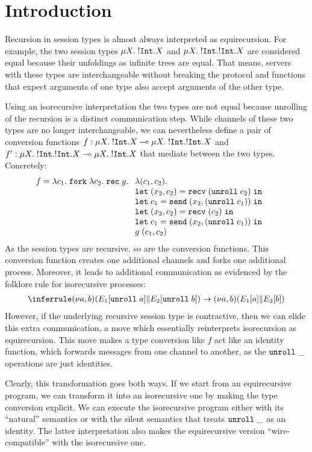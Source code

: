 
\section{Introduction}
\label{sec:introduction}

Recursion in session types is almost always interpreted as
equirecursion. For example, the two session types $\mu X.\;{{}!\mathtt{Int}.X} $
and $\mu X.\;{{}!\mathtt{Int}.{}!\mathtt{Int}.X} $ are considered equal because
their unfoldings as infinite trees are equal. That means, servers with
these types are interchangeable without breaking the protocol and
functions that expect arguments of one type also accept arguments of
the other type.

Using an isorecursive interpretation the two types are not equal
because unrolling of the recursion is a distinct communication
step. While channels of these two types are no longer
interchangeable, we can nevertheless define a pair of conversion
functions
$f : \mu X.\;{{}!\mathtt{Int}.X} \multimap \mu X.\;{{}!\mathtt{Int}.{}!\mathtt{Int}.X}$
and
$f' : \mu X.\;{{}!\mathtt{Int}.{}!\mathtt{Int}.X} \multimap \mu X.\;{{}!\mathtt{Int}.X}$
that mediate between the two types. Concretely:
\begin{align*}
  f &=       \ELam {c_1} \EFork{ \ELam {c_2} \ERec g %
      \begin{array}[t]{l}
      \ELam{(c_1, c_2)} \\
      \ELet{(x_2,c_2)}{\ERecv{(\EUnroll{c_2})}} \\
      \ELet{c_1}{\ESend{x_2}{(\EUnroll{c_1})}} \\
      \ELet{(x_2,c_2)}{\ERecv{({c_2})}} \\
      \ELet{c_1}{\ESend{x_2}{(\EUnroll{c_1})}} \\
        g \; ({c_1}, {c_2}) %
      \end{array}}
\end{align*}
As the session types are recursive, so are the conversion
functions. This conversion function creates one additional
channels and forks one additional process. Moreover, it leads to
additional communication as evidenced by the folklore rule for
isorecursive processes:
\begin{gather*}
  \reducerule{
    \PScope (\PPar* {\EUnroll a} {\EUnroll b})
  }{
    \PScope (\PPar* a b)
  }
\end{gather*}
However, if the underlying recursive session type is contractive, then we can
elide this extra communication, a move which essentially reinterprets
isorecursion as equirecursion.
This move makes a type conversion like $f$ act like an identity
function, which forwards messages from one channel to another, as the
$\mathtt{unroll}\; \_$ operations are just identities. 


Clearly, this transformation goes both ways. If we start from an
equirecursive program, we can transform it into an isorecursive one by
making the type conversion explicit. We can execute the isorecursive
program either with its ``natural'' semantics or with the silent
semantics that treats $\mathtt{unroll}\; \_$ as an identity.
The latter interpretation also makes the equirecursive version
``wire-compatible'' with the isorecursive one.


  

